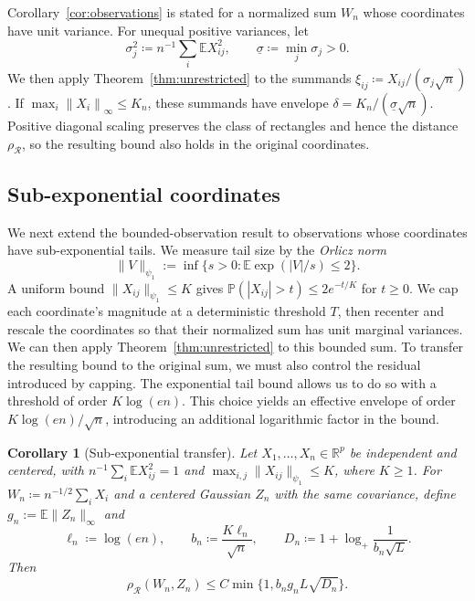 \documentclass[11pt,letterpaper,twoside,leqno]{article}
\theoremstyle{bookplain}
\newtheorem{corollary}{Corollary}
\theoremstyle{bookremark}
\newcommand{\E}{\mathbb E}
\newcommand{\Pp}{\mathbb P}
\newcommand{\R}{\mathbb R}
\newcommand{\norm}[1]{\left\lVert#1\right\rVert}
\newcommand{\rh}{\rho_{\mathcal R}}
\begin{document}
{
Corollary~\ref{cor:observations} is stated for a normalized sum \(W_n\)
whose coordinates have unit variance. For unequal positive variances, let
\[
 \sigma_j^2\coloneqq n^{-1}\sum_i\E X_{ij}^2,
 \qquad
 \underline\sigma\coloneqq \min_j\sigma_j>0.
\]
We then apply Theorem~\ref{thm:unrestricted} to the summands
\(\xi_{ij}\coloneqq X_{ij}/(\sigma_j\sqrt n)\). If
\(\max_i\norm{X_i}_\infty\le K_n\), these summands have
envelope \(\delta=K_n/(\underline\sigma\sqrt n)\).
Positive diagonal scaling preserves the class of rectangles and hence
the distance \(\rh\), so the resulting bound also holds in the
original coordinates.
}

\subsection{Sub-exponential coordinates}\label{sec:subexponential}
{
We next extend the bounded-observation result to observations whose
coordinates have sub-exponential tails. We measure tail size by the
\emph{Orlicz norm}
\[
 \|V\|_{\psi_1}:=\inf\{s>0:\E\exp(|V|/s)\le2\}.
\]
A uniform bound \(\|X_{ij}\|_{\psi_1}\le K\) gives
\(\Pp(|X_{ij}|>t)\le2e^{-t/K}\) for \(t\ge0\).
We cap each coordinate's magnitude at a deterministic threshold \(T\),
then recenter and rescale the coordinates so that their normalized
sum has unit marginal variances. We can then apply
Theorem~\ref{thm:unrestricted} to this bounded sum. To transfer the
resulting bound to the original sum, we must also control the residual
introduced by capping. The exponential tail bound allows us to do so
with a threshold of order \(K\log(en)\). This choice yields an
effective envelope of order \(K\log(en)/\sqrt n\), introducing an
additional logarithmic factor in the bound.
}

\begin{corollary}[Sub-exponential transfer]\label{cor:subexponential}
Let \(X_1,\ldots,X_n\in\R^p\) be independent and centered, with
\(n^{-1}\sum_i\E X_{ij}^2=1\) and
\(\max_{i,j}\|X_{ij}\|_{\psi_1}\le K\), where \(K\ge1\).
For \(W_n\coloneqq n^{-1/2}\sum_iX_i\) and a centered Gaussian \(Z_n\)
with the same covariance, {define \(g_n:=\E\|Z_n\|_\infty\) and}
\[
 \ell_n\coloneqq \log(en),\qquad b_n\coloneqq \frac{K\ell_n}{\sqrt n},\qquad
 D_n\coloneqq 1+\log_+\frac1{b_n\sqrt L}.
\]
Then
\begin{equation}
 {\rh(W_n,Z_n)\le C\min\{1,b_ng_nL\sqrt{D_n}\}.}
 \label{eq:subexponential}
\end{equation}

\end{corollary}
\end{document}
